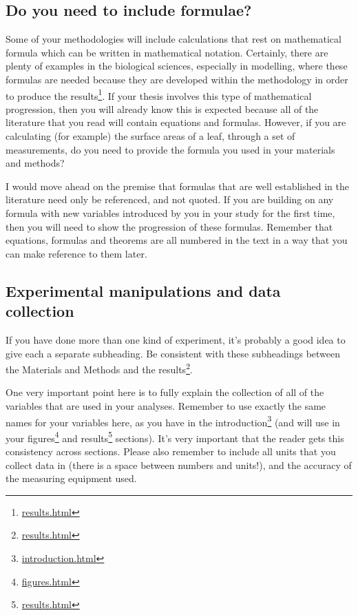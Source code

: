 \documentclass[
]{krantz}
\renewcommand{\href}[2]{#2\footnote{\url{#1}}}
\begin{document}
\hypertarget{do-you-need-to-include-formulae}{%
\subsection{Do you need to include formulae?}\label{do-you-need-to-include-formulae}}

Some of your methodologies will include calculations that rest on mathematical formula which can be written in mathematical notation. Certainly, there are plenty of examples in the biological sciences, especially in modelling, where these formulas are needed because they are developed within the methodology in order to produce the \href{results.html}{results}. If your thesis involves this type of mathematical progression, then you will already know this is expected because all of the literature that you read will contain equations and formulas. However, if you are calculating (for example) the surface areas of a leaf, through a set of measurements, do you need to provide the formula you used in your materials and methods?

I would move ahead on the premise that formulas that are well established in the literature need only be referenced, and not quoted. If you are building on any formula with new variables introduced by you in your study for the first time, then you will need to show the progression of these formulas. Remember that equations, formulas and theorems are all numbered in the text in a way that you can make reference to them later.

\hypertarget{experimental-manipulations-and-data-collection}{%
\subsection{Experimental manipulations and data collection}\label{experimental-manipulations-and-data-collection}}

If you have done more than one kind of experiment, it's probably a good idea to give each a separate subheading. Be consistent with these subheadings between the Materials and Methods and the \href{results.html}{results}.

One very important point here is to fully explain the collection of all of the variables that are used in your analyses. Remember to use exactly the same names for your variables here, as you have in the \href{introduction.html}{introduction} (and will use in your \href{figures.html}{figures} and \href{results.html}{results} sections). It's very important that the reader gets this consistency across sections. Please also remember to include all units that you collect data in (there is a space between numbers and units!), and the accuracy of the measuring equipment used.
\end{document}
